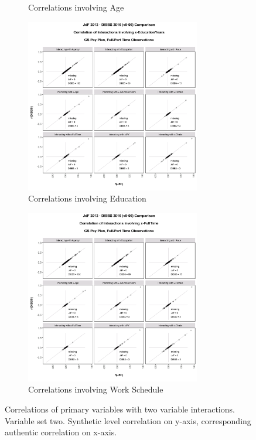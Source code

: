 \documentclass[10pt, letterpaper]{article}
\begin{document}
\begin{spacing}{1.0}
\begin{figure}[ht]
\begin{subfigure}{.5\textwidth}
        \caption{Correlations involving Age}
        \vspace{10pt}
    \end{subfigure}%
    \begin{subfigure}{.5\textwidth}
        \centering
        \includegraphics[width=3in, trim={0 0.25in 0 1in}, clip]{JdFDIBBSCorrelationInteraction-x-EducationYears.png}
        \caption{Correlations involving Education}
        \vspace{10pt}
    \end{subfigure}
    \begin{subfigure}{.5\textwidth}
        \centering
        \includegraphics[width=3in, trim={0 0.25in 0 1in}, clip]{JdFDIBBSCorrelationInteraction-x-FullTime.png}
        \caption{Correlations involving Work Schedule}
        \vspace{10pt}
    \end{subfigure}
    \caption{Correlations of primary variables with two variable interactions.  Variable set two.  Synthetic level correlation on y-axis, corresponding authentic correlation on x-axis.}
    \label{figure:JdFDIBBSCorrelationInteraction2}
\end{figure}  


\end{spacing}
\end{document}
